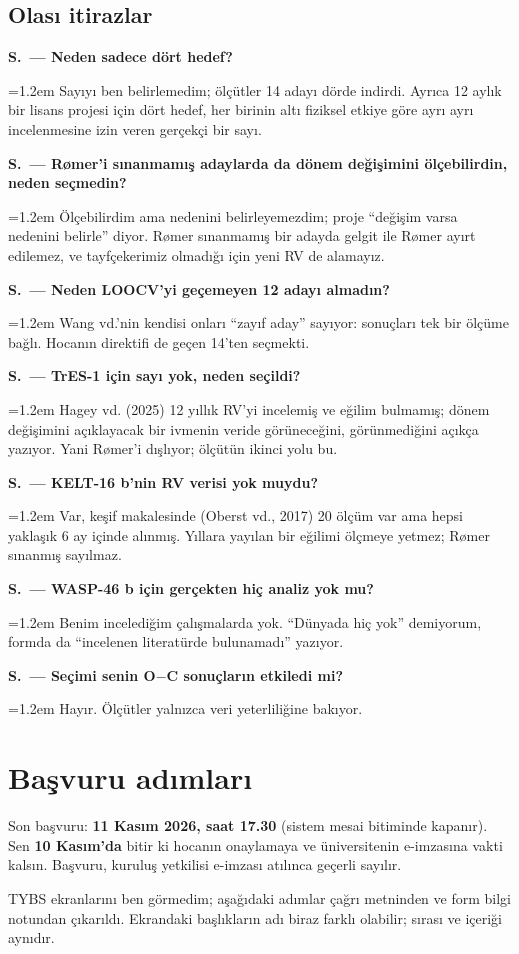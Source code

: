 \documentclass[11pt,a4paper]{article}
\newcounter{sor}[section]
\newcommand{\SC}[2]{\stepcounter{sor}\par\noindent\textbf{S\thesection.\thesor\ — #1}\par\nopagebreak
  \noindent\hangindent=1.2em\hangafter=0 #2\par\vspace{0.35em}}
\begin{document}
\subsection{Olası itirazlar}
\SC{Neden sadece dört hedef?}{Sayıyı ben belirlemedim; ölçütler 14 adayı dörde indirdi. Ayrıca 12 aylık bir lisans projesi için dört hedef, her birinin altı fiziksel etkiye göre ayrı ayrı incelenmesine izin veren gerçekçi bir sayı.}
\SC{Rømer'i sınanmamış adaylarda da dönem değişimini ölçebilirdin, neden seçmedin?}{Ölçebilirdim ama nedenini belirleyemezdim; proje ``değişim varsa nedenini belirle'' diyor. Rømer sınanmamış bir adayda gelgit ile Rømer ayırt edilemez, ve tayfçekerimiz olmadığı için yeni RV de alamayız.}
\SC{Neden LOOCV'yi geçemeyen 12 adayı almadın?}{Wang vd.'nin kendisi onları ``zayıf aday'' sayıyor: sonuçları tek bir ölçüme bağlı. Hocanın direktifi de geçen 14'ten seçmekti.}
\SC{TrES-1 için sayı yok, neden seçildi?}{Hagey vd. (2025) 12 yıllık RV'yi incelemiş ve eğilim bulmamış; dönem değişimini açıklayacak bir ivmenin veride görüneceğini, görünmediğini açıkça yazıyor. Yani Rømer'i dışlıyor; ölçütün ikinci yolu bu.}
\SC{KELT-16 b'nin RV verisi yok muydu?}{Var, keşif makalesinde (Oberst vd., 2017) 20 ölçüm var ama hepsi yaklaşık 6 ay içinde alınmış. Yıllara yayılan bir eğilimi ölçmeye yetmez; Rømer sınanmış sayılmaz.}
\SC{WASP-46 b için gerçekten hiç analiz yok mu?}{Benim incelediğim çalışmalarda yok. ``Dünyada hiç yok'' demiyorum, formda da ``incelenen literatürde bulunamadı'' yazıyor.}
\SC{Seçimi senin O$-$C sonuçların etkiledi mi?}{Hayır. Ölçütler yalnızca veri yeterliliğine bakıyor.}

\section{Başvuru adımları}

\begin{dikkat}[Tarihler]
Son başvuru: \textbf{11 Kasım 2026, saat 17.30} (sistem mesai bitiminde kapanır). Sen \textbf{10 Kasım'da} bitir ki hocanın onaylamaya ve üniversitenin e-imzasına vakti kalsın. Başvuru, kuruluş yetkilisi e-imzası atılınca geçerli sayılır.
\end{dikkat}

\begin{bilgi}[Not]
TYBS ekranlarını ben görmedim; aşağıdaki adımlar çağrı metninden ve form bilgi notundan çıkarıldı. Ekrandaki başlıkların adı biraz farklı olabilir; sırası ve içeriği aynıdır.
\end{bilgi}
\end{document}
